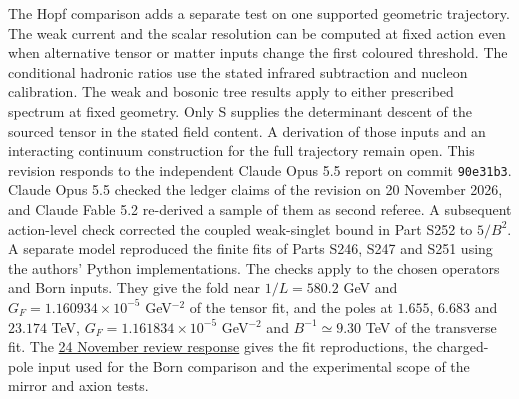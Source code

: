 \documentclass[aps,prd,reprint,onecolumn,nofootinbib,amsmath,amssymb]{revtex4-2}
\begin{document}
The Hopf comparison adds a separate test on one supported geometric trajectory. The weak current and the scalar resolution can be computed at fixed action even when alternative tensor or matter inputs change the first coloured threshold. The conditional hadronic ratios use the stated infrared subtraction and nucleon calibration. The weak and bosonic tree results apply to either prescribed spectrum at fixed geometry. Only S supplies the determinant descent of the sourced tensor in the stated field content. A derivation of those inputs and an interacting continuum construction for the full trajectory remain open.
\smallskip
\noindent This revision responds to the independent Claude Opus 5.5 report on commit \texttt{90e31b3}. Claude Opus 5.5 checked the ledger claims of the revision on 20 November 2026, and Claude Fable 5.2 re-derived a sample of them as second referee. A subsequent action-level check corrected the coupled weak-singlet bound in Part S252 to $5/B^2$. A separate model reproduced the finite fits of Parts S246, S247 and S251 using the authors' Python implementations. The checks apply to the chosen operators and Born inputs. They give the fold near $1/L=580.2$ GeV and $G_F=1.160934\times10^{-5}$ GeV$^{-2}$ of the tensor fit, and the poles at $1.655$, $6.683$ and $23.174$ TeV, $G_F=1.161834\times10^{-5}$ GeV$^{-2}$ and $B^{-1}\simeq9.30$ TeV of the transverse fit. The \href{https://github.com/arivero/conneskk/blob/master/paper/NUMERICAL_CHECKS.md}{24 November review response} gives the fit reproductions, the charged-pole input used for the Born comparison and the experimental scope of the mirror and axion tests.


\end{document}

